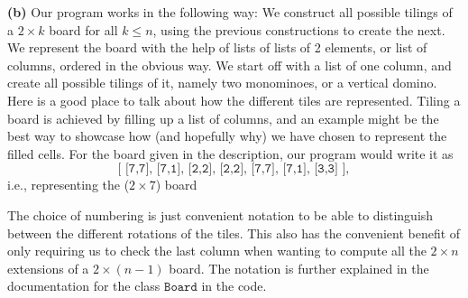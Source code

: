 \documentclass[11pt,a4paper]{article}
\begin{document}
\noindent \textbf{(b)} Our program works in the following way: We construct all
possible tilings of a $2\times k$ board for all $k \leq n$, using the previous
constructions to create the next. We represent the board with the help of lists
of lists of 2 elements, or list of columns, ordered in the obvious way. We
start off with a list of one column, and create all possible tilings of it,
namely two monominoes, or a vertical domino. Here is a good place to talk about
how the different tiles are represented. Tiling a board is achieved by filling
up a list of columns, and an example might be the best way to showcase how (and
hopefully why) we have chosen to represent the filled cells. For the board given
in the description, our program would write it as \[
\texttt{[ [7,7], [7,1], [2,2], [2,2], [7,7], [7,1], [3,3] ]},
\] i.e., representing the ($2\times 7$) board 
\begin{center}
\end{center}
The choice of numbering is just convenient notation to be able to distinguish between the different rotations of the tiles. This also has the convenient benefit of only requiring us to check the last column when wanting to compute all the $2\times n$ extensions of a $2\times (n-1)$ board. The notation is further explained in the documentation for the class $\texttt{Board}$ in the code.
\end{document}
